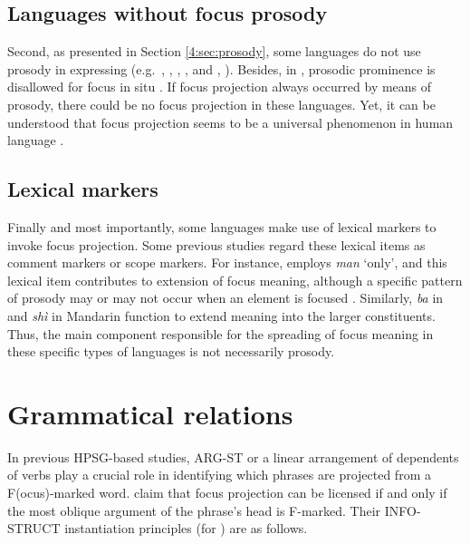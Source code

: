\subsection{Languages without focus prosody}
\label{8:ssec:no-prosodic}


Second, as presented in Section \ref{4:sec:prosody}, some languages do not use prosody
in expressing  (e.g.\ ,
\citealt{kugler:etal:07}, , \citealt{drubig:03}, and
, \citealt{engdahl:vallduvi:96}).  Besides, in
, prosodic prominence is disallowed for focus in situ
\citep{hartmann:zimmermann:07,buring:10} . If focus projection always occurred by means of prosody,
there could be no focus projection in these languages. Yet, it can be
understood that focus projection seems to be a universal phenomenon in
human language \citep{buring:06}.




\subsection{Lexical markers}
\label{8:ssec:comment-scope}

Finally and most importantly, some languages make use of lexical
markers to invoke focus projection. Some previous
studies regard these lexical items as comment markers or scope
markers.  For instance,  employs \textit{man} `only', and
this lexical item contributes to extension of focus
meaning, although a specific pattern of prosody may or may
not occur when an element is focused \citep{choe:02}.  Similarly,
\textit{ba} in  \citep{schneider:09} and \textit{sh\`{i}} in
Mandarin  \citep{prince:12} function to extend 
meaning into the larger constituents.  Thus, the main component
responsible for the spreading of focus meaning in these specific types
of languages is not necessarily prosody.



\section{Grammatical relations}
\label{10-4:sec:grammatical}

In previous HPSG-based studies, ARG-ST or a linear
arrangement of dependents of verbs play a crucial role in identifying
which phrases are projected from a F(ocus)-marked word. \citet{engdahl:vallduvi:96} claim that focus projection
can be licensed if and only if the most oblique argument of the
phrase's head is F-marked. Their INFO-STRUCT instantiation principles
(for ) are as follows.


